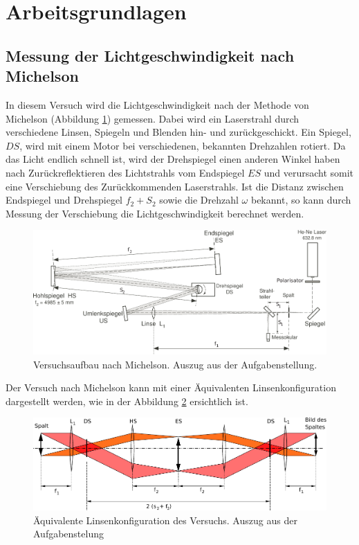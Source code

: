 \section{Arbeitsgrundlagen}


\subsection{Messung der Lichtgeschwindigkeit nach Michelson}

In diesem Versuch wird die Lichtgeschwindigkeit nach der Methode von Michelson
(Abbildung  \ref{fig:michelson}) gemessen. Dabei  wird  ein Laserstrahl  durch
verschiedene  Linsen, Spiegeln  und  Blenden  hin- und  zur\"uckgeschickt. Ein
Spiegel, $DS$,  wird mit einem  Motor bei verschiedenen,  bekannten Drehzahlen
rotiert.  Da das Licht endlich schnell ist, wird der Drehspiegel einen anderen
Winkel haben  nach Zur\"uckreflektieren  des Lichtstrahls vom  Endspiegel $ES$
und verursacht somit eine Verschiebung des Zur\"uckkommenden Laserstrahls. Ist
die  Distanz  zwischen  Endspiegel  und  Drehspiegel $f_2  +  S_2$  sowie  die
Drehzahl  $\omega$  bekannt,  so  kann  durch  Messung  der  Verschiebung  die
Lichtgeschwindigkeit berechnet werden.

\begin{figure}[H]
    \center
    \includegraphics[width=\textwidth]{images/michelson.pdf}
    \caption{Versuchsaufbau nach Michelson. Auszug aus der Aufgabenstellung.}
    \label{fig:michelson}
\end{figure}

Der Versuch  nach Michelson kann mit  einer \"Aquivalenten Linsenkonfiguration
dargestellt werden,  wie in  der Abbildung  \ref{fig:linsenkonfig} ersichtlich
ist.

\begin{figure}[H]
    \center
    \includegraphics[width=\textwidth]{images/linsenkonfig.pdf}
    \caption{\"Aquivalente Linsenkonfiguration des Versuchs. Auszug aus der Aufgabenstelung}
    \label{fig:linsenkonfig}
\end{figure}

